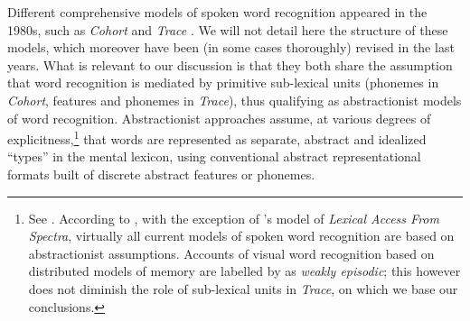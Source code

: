 Different comprehensive models of spoken word recognition appeared in the 1980s, such as \textit{Cohort} \citep{marslen1980temporal} and \textit{Trace} \citep{mcclelland1986trace}. We will not detail here the structure of these models, which moreover have been (in some cases thoroughly) revised in the last years. What is relevant to our discussion is that they both share the assumption that word recognition is mediated by primitive sub-lexical units (phonemes in \textit{Cohort}, features and phonemes in \textit{Trace}), thus qualifying as abstractionist models of word recognition. Abstractionist approaches assume, at various degrees of explicitness,\footnote{See \citet{licklider1952process, peterson1952information, lindgren1965machine}. According to \citet{luce2005spoken}, with the exception of \citeauthor{klatt1979speech}'s \citeyearpar{klatt1979speech} model of \textit{Lexical Access From Spectra}, virtually all current models of spoken word recognition are based on abstractionist assumptions. Accounts of visual word recognition based on distributed models of memory \citep{mcclelland1985distributed} are labelled by \citet{tenpenny1995abstractionist} as \textit{weakly episodic}; this however does not diminish the role of sub-lexical units in \textit{Trace}, on which we base our conclusions.} that words are represented as separate, abstract and idealized ``types'' in the mental lexicon, using conventional abstract representational formats built of discrete abstract features or phonemes.

